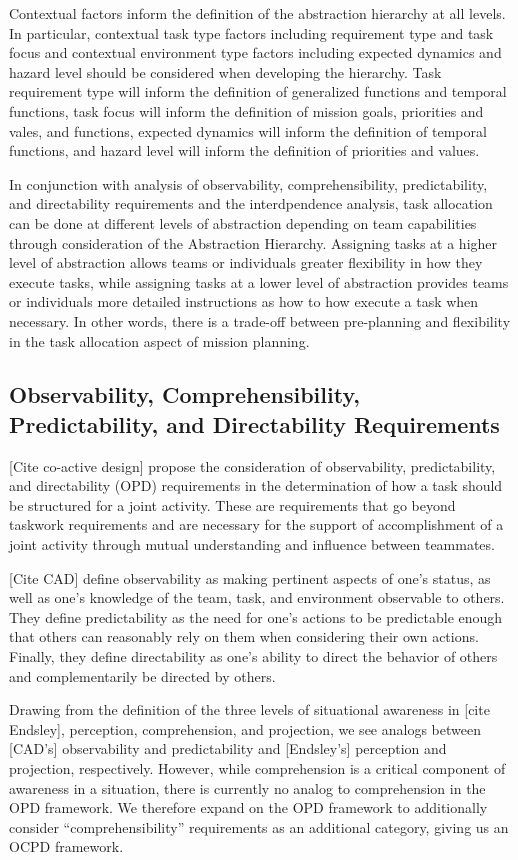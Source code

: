 \documentclass[letterpaper, 10 pt, conference]{ieeeconf}  %
\theoremstyle{definition}
\begin{document}
Contextual factors inform the definition of the abstraction hierarchy at all levels. In particular, contextual task type factors including requirement type and task focus and contextual environment type factors including expected dynamics and hazard level should be considered when developing the hierarchy. Task requirement type will inform the definition of generalized functions and temporal functions, task focus will inform the definition of mission goals, priorities and vales, and functions, expected dynamics will inform the definition of temporal functions, and hazard level will inform the definition of priorities and values. 


In conjunction with analysis of observability, comprehensibility, predictability, and directability requirements and the interdpendence analysis, task allocation can be done at different levels of abstraction depending on team capabilities through consideration of the Abstraction Hierarchy. Assigning tasks at a higher level of abstraction allows teams or individuals greater flexibility in how they execute tasks, while assigning tasks at a lower level of abstraction provides teams or individuals more detailed instructions as how to how execute a task when necessary. In other words, there is a trade-off between pre-planning and flexibility in the task allocation aspect of mission planning.

\subsection{Observability, Comprehensibility, Predictability, and Directability Requirements}
[Cite co-active design] propose the consideration of observability, predictability, and directability (OPD) requirements in the determination of how a task should be structured for a joint activity. These are requirements that go beyond taskwork requirements and are necessary for the support of accomplishment of a joint activity through mutual understanding and influence between teammates. 

[Cite CAD] define observability as making pertinent aspects of one’s status, as well as one’s knowledge of the team, task, and environment observable to others. They define predictability as the need for one’s actions to be predictable enough that others can reasonably rely on them when considering their own actions. Finally, they define directability as one’s ability to direct the behavior of others and complementarily be directed by others. 

Drawing from the definition of the three levels of situational awareness in [cite Endsley], perception, comprehension, and projection, we see analogs between [CAD's] observability and predictability and [Endsley's] perception and projection, respectively. However, while comprehension is a critical component of awareness in a situation, there is currently no analog to comprehension in the OPD framework. We therefore expand on the OPD framework to additionally consider ``comprehensibility'' requirements as an additional category, giving us an OCPD framework.
\end{document}
